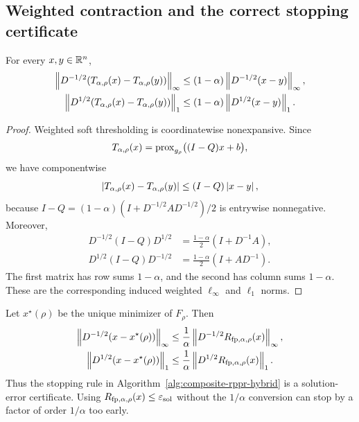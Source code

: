 \subsection{Weighted contraction and the correct stopping certificate}

\begin{lemma}
\label{lem:rppr-prox-contraction}
For every $x,y\in\mathbb{R}^n$,
\begin{align}
  \left\lVert D^{-1/2}(T_{\alpha,\rho}(x)-T_{\alpha,\rho}(y))\right\rVert_\infty
  &\leq
  (1-\alpha)\left\lVert D^{-1/2}(x-y)\right\rVert_\infty,
  \label{eq:rppr-prox-infty}\\
  \left\lVert D^{1/2}(T_{\alpha,\rho}(x)-T_{\alpha,\rho}(y))\right\rVert_1
  &\leq
  (1-\alpha)\left\lVert D^{1/2}(x-y)\right\rVert_1.
  \label{eq:rppr-prox-one}
\end{align}
\end{lemma}

\begin{proof}
Weighted soft thresholding is coordinatewise nonexpansive.  Since
\[
  T_{\alpha,\rho}(x)
  =\operatorname{prox}_{g_\rho}\bigl((I-Q)x+b\bigr),
\]
we have componentwise
\[
  \left\lvert T_{\alpha,\rho}(x)-T_{\alpha,\rho}(y)\right\rvert
  \leq (I-Q)\left\lvert x-y\right\rvert,
\]
because
$I-Q=(1-\alpha)(I+D^{-1/2}AD^{-1/2})/2$
is entrywise nonnegative.  Moreover,
\begin{align*}
  D^{-1/2}(I-Q)D^{1/2}
  &=\frac{1-\alpha}{2}(I+D^{-1}A),\\
  D^{1/2}(I-Q)D^{-1/2}
  &=\frac{1-\alpha}{2}(I+AD^{-1}).
\end{align*}
The first matrix has row sums $1-\alpha$, and the second has column sums
$1-\alpha$.  These are the corresponding induced weighted
$\ell_\infty$ and $\ell_1$ norms.
\end{proof}

\begin{corollary}
\label{cor:rppr-prox-certificate}
Let $x^\star(\rho)$ be the unique minimizer of $F_\rho$.  Then
\begin{align}
  \left\lVert D^{-1/2}(x-x^\star(\rho))\right\rVert_\infty
  &\leq
  \frac1\alpha\left\lVert D^{-1/2}R_{\mathrm{fp},\alpha,\rho}(x)\right\rVert_\infty,
  \label{eq:rppr-residual-infty}\\
  \left\lVert D^{1/2}(x-x^\star(\rho))\right\rVert_1
  &\leq
  \frac1\alpha\left\lVert D^{1/2}R_{\mathrm{fp},\alpha,\rho}(x)\right\rVert_1.
  \label{eq:rppr-residual-one}
\end{align}
Thus the stopping rule in Algorithm~\ref{alg:composite-rppr-hybrid} is a
solution-error certificate.  Using $R_{\mathrm{fp},\alpha,\rho}(x)\leq\varepsilon_{\mathrm{sol}}$ without the
$1/\alpha$ conversion can stop by a factor of order $1/\alpha$ too early.
\end{corollary}

